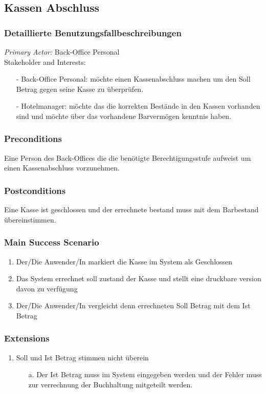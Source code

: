 \documentclass[./detailed_overview_usecases.tex]{subfiles}
\begin{document}
    \subsection{Kassen Abschluss}
    \subsubsection{Detaillierte Benutzungsfallbeschreibungen}
    \textit{Primary Actor:}
    Back-Office Personal
    \\
    Stakeholder and Interests:
    \begin{itemize}
        \item[-] Back-Office Personal: möchte einen Kassenabschluss
        machen um den Soll Betrag gegen seine Kasse zu überprüfen.
        \item[-] Hotelmanager: möchte das die korrekten Bestände in
        den Kassen vorhanden sind und möchte über das vorhandene Barvermögen
        kenntnis haben.
    \end{itemize}

    \subsubsection*{Preconditions}
    Eine Person des Back-Offices die die benötigte Berechtigungsstufe
    aufweist um einen Kassenabschluss vorzunehmen.

    \subsubsection*{Postconditions}
    Eine Kasse ist geschlossen und der errechnete bestand muss mit dem
    Barbestand übereinstimmen.

    \subsubsection*{Main Success Scenario}
    \begin{enumerate}
        \item Der/Die Anwender/In markiert die Kasse im System als Geschlossen
        \item Das System errechnet soll zustand der Kasse und stellt eine druckbare
        version davon zu verfügung
        \item Der/Die Anwender/In vergleicht denn errechneten Soll Betrag mit dem
        Ist Betrag
    \end{enumerate}

    \subsubsection*{Extensions}
    \begin{enumerate}
        \item Soll und Ist Betrag stimmen nicht überein
        \begin{itemize}
            \item[a.] Der Ist Betrag muss im System eingegeben werden und der Fehler
            muss zur verrechnung der Buchhaltung mitgeteilt werden.
        \end{itemize}
    \end{enumerate}
\end{document}
